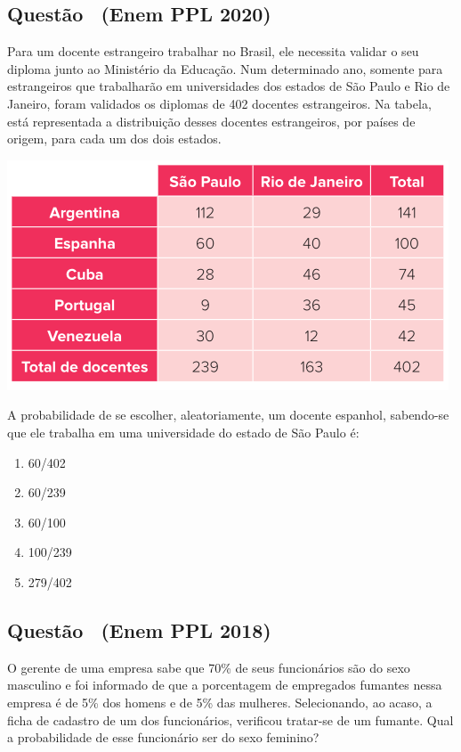 \documentclass[12pt]{article}
\newcounter{questao}
\newcommand{\novaquestao}[1]{%
  \stepcounter{questao}%
  \subsection*{Questão \thequestao\ (#1)}%
}
\begin{document}
\begin{multicols}{2}
        \novaquestao{Enem PPL 2020}

            Para um docente estrangeiro trabalhar no Brasil, ele necessita validar o seu 
            diploma junto ao Ministério da Educação. Num determinado ano, somente para 
            estrangeiros que trabalharão em universidades dos estados de São Paulo e 
            Rio de Janeiro, foram validados os diplomas de 402 docentes estrangeiros. Na 
            tabela, está representada a distribuição desses docentes estrangeiros, por países
            de origem, para cada um dos dois estados.

            \begin{center}
                \includegraphics[scale=0.5]{imagens/enem-ppl-2020.png}
            \end{center} A probabilidade de se escolher, aleatoriamente, um docente espanhol, 
            sabendo-se que ele trabalha em uma universidade do estado de São Paulo é:

            \begin{enumerate}[label=(\alph*), noitemsep]
                \item {60}/{402}
                \item {60}/{239}
                \item {60}/{100}
                \item {100}/{239}
                \item {279}/{402}
            \end{enumerate}
        
        \novaquestao{Enem PPL 2018}
            
            O gerente de uma empresa sabe que 70\% de seus funcionários são do sexo 
            masculino e foi informado de que a porcentagem de empregados fumantes nessa 
            empresa é de 5\% dos homens e de 5\% das mulheres. Selecionando, ao acaso, a ficha 
            de cadastro de um dos funcionários, verificou tratar-se de um fumante. Qual 
            a probabilidade de esse funcionário ser do sexo feminino?


\end{multicols}
\end{document}
